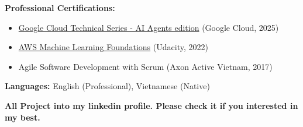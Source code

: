 \documentclass[10pt,a4paper,ragged2e,withhyper]{altacv}
\begin{document}
\textbf{Professional Certifications:}
\begin{itemize}[leftmargin=*,noitemsep,topsep=0pt]
    \item \href{https://www.credential.net/f16b9afc-1d7a-4427-b7e3-f0bf76cd75ae}{Google Cloud Technical Series - AI Agents edition} (Google Cloud, 2025)
    \item \href{https://s3-us-west-2.amazonaws.com/udacity-printer/production/certificates/0ad10fbf-13db-4f96-b196-a108e3bff2b2.pdf}{AWS Machine Learning Foundations} (Udacity, 2022)
    \item Agile Software Development with Scrum (Axon Active Vietnam, 2017)
\end{itemize}

\smallskip
\textbf{Languages:} English (Professional), Vietnamese (Native)

\smallskip

\textbf{All Project into my linkedin profile. Please check it if you interested in my best.} 
\end{document}
